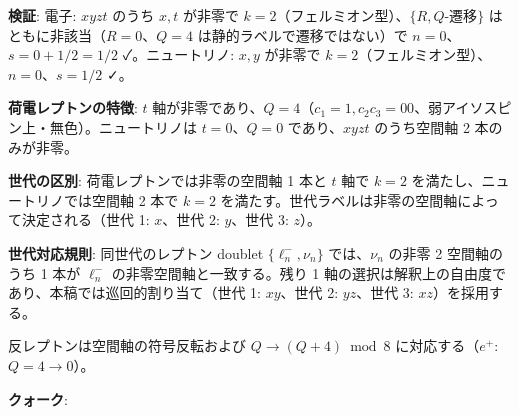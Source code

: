 \documentclass[
  a4paper,11pt]{ltjsarticle}
\theoremstyle{definition}
\theoremstyle{remark}
\begin{document}
\textbf{検証}: 電子: \(xyzt\) のうち \(x, t\) が非零で
\(k = 2\)（フェルミオン型）、\(\{R, Q\text{-遷移}\}\)
はともに非該当（\(R = 0\)、\(Q = 4\) は静的ラベルで遷移ではない）で
\(n = 0\)、\(s = 0 + 1/2 = 1/2\) ✓。ニュートリノ: \(x, y\) が非零で
\(k = 2\)（フェルミオン型）、\(n = 0\)、\(s = 1/2\) ✓。

\textbf{荷電レプトンの特徴}: \(t\)
軸が非零であり、\(Q = 4\)（\(c_1 = 1, c_2 c_3 = 00\)、弱アイソスピン上・無色）。ニュートリノは
\(t = 0\)、\(Q = 0\) であり、\(xyzt\) のうち空間軸 2 本のみが非零。

\textbf{世代の区別}: 荷電レプトンでは非零の空間軸 1 本と \(t\) 軸で
\(k = 2\) を満たし、ニュートリノでは空間軸 2 本で \(k = 2\)
を満たす。世代ラベルは非零の空間軸によって決定される（世代 1:
\(x\)、世代 2: \(y\)、世代 3: \(z\)）。

\textbf{世代対応規則}: 同世代のレプトン doublet \(\{\ell^-_n, \nu_n\}\)
では、\(\nu_n\) の非零 2 空間軸のうち 1 本が \(\ell^-_n\)
の非零空間軸と一致する。残り 1
軸の選択は解釈上の自由度であり、本稿では巡回的割り当て（世代 1:
\(xy\)、世代 2: \(yz\)、世代 3: \(xz\)）を採用する。

反レプトンは空間軸の符号反転および \(Q \to (Q + 4) \bmod 8\)
に対応する（\(e^+\): \(Q = 4 \to 0\)）。

\textbf{クォーク}:
\end{document}
